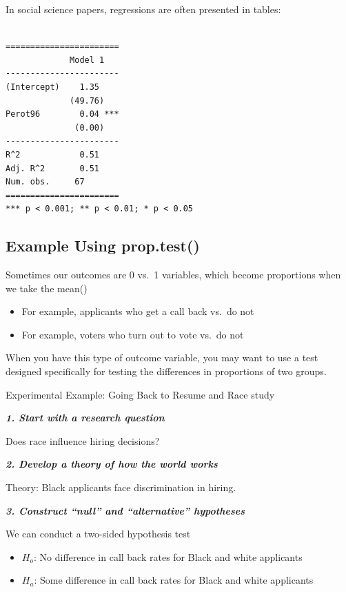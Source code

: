 \documentclass[
  letterpaper,
  DIV=11,
  numbers=noendperiod]{scrreprt}
\providecommand{\tightlist}{%
  \setlength{\itemsep}{0pt}\setlength{\parskip}{0pt}}\usepackage{longtable,booktabs,array}
\begin{document}
In social science papers, regressions are often presented in tables:

\begin{verbatim}

=======================
             Model 1   
-----------------------
(Intercept)    1.35    
             (49.76)   
Perot96        0.04 ***
              (0.00)   
-----------------------
R^2            0.51    
Adj. R^2       0.51    
Num. obs.     67       
=======================
*** p < 0.001; ** p < 0.01; * p < 0.05
\end{verbatim}

\hypertarget{example-using-prop.test}{%
\subsection{Example Using prop.test()}\label{example-using-prop.test}}

Sometimes our outcomes are 0 vs.~1 variables, which become proportions
when we take the mean()

\begin{itemize}
\tightlist
\item
  For example, applicants who get a call back vs.~do not
\item
  For example, voters who turn out to vote vs.~do not
\end{itemize}

When you have this type of outcome variable, you may want to use a test
designed specifically for testing the differences in proportions of two
groups.

Experimental Example: Going Back to Resume and Race study

\textbf{\emph{1. Start with a research question}}

Does race influence hiring decisions?

\textbf{\emph{2. Develop a theory of how the world works}}

Theory: Black applicants face discrimination in hiring.

\textbf{\emph{3. Construct ``null'' and ``alternative'' hypotheses}}

We can conduct a two-sided hypothesis test

\begin{itemize}
\tightlist
\item
  \(H_o\): No difference in call back rates for Black and white
  applicants
\item
  \(H_a\): Some difference in call back rates for Black and white
  applicants
\end{itemize}
\end{document}
